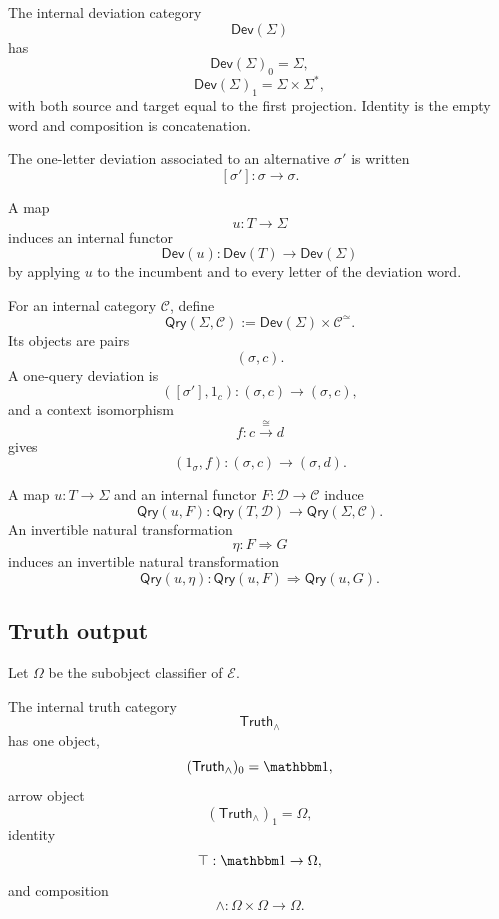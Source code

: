 \begin{definition}
\label{def:internal-deviation-category}
The internal deviation category
\[
  \mathsf{Dev}(\Sigma)
\]
has
\[
  \mathsf{Dev}(\Sigma)_0=\Sigma,
\]
\[
  \mathsf{Dev}(\Sigma)_1=\Sigma\times\Sigma^\ast,
\]
with both source and target equal to the first projection. Identity is the empty word and
composition is concatenation.

The one-letter deviation associated to an alternative \(\sigma'\) is written
\[
  [\sigma']:\sigma\longrightarrow\sigma.
\]
\end{definition}

A map
\[
  u:T\to\Sigma
\]
induces an internal functor
\[
  \mathsf{Dev}(u):
  \mathsf{Dev}(T)
  \longrightarrow
  \mathsf{Dev}(\Sigma)
\]
by applying \(u\) to the incumbent and to every letter of the deviation word.

\begin{definition}
\label{def:internal-query-category}
For an internal category \(\mathcal C\), define
\[
  \mathsf{Qry}(\Sigma,\mathcal C)
  :=
  \mathsf{Dev}(\Sigma)\times\mathcal C^\simeq.
\]
Its objects are pairs
\[
  (\sigma,c).
\]
A one-query deviation is
\[
  ([\sigma'],1_c):
  (\sigma,c)\longrightarrow(\sigma,c),
\]
and a context isomorphism
\[
  f:c\overset{\cong}{\longrightarrow}d
\]
gives
\[
  (1_\sigma,f):
  (\sigma,c)\longrightarrow(\sigma,d).
\]
\end{definition}

A map \(u:T\to\Sigma\) and an internal functor \(F:\mathcal D\to\mathcal C\) induce
\[
  \mathsf{Qry}(u,F):
  \mathsf{Qry}(T,\mathcal D)
  \longrightarrow
  \mathsf{Qry}(\Sigma,\mathcal C).
\]
An invertible natural transformation
\[
  \eta:F\Longrightarrow G
\]
induces an invertible natural transformation
\[
  \mathsf{Qry}(u,\eta):
  \mathsf{Qry}(u,F)
  \Longrightarrow
  \mathsf{Qry}(u,G).
\]

\subsection{Truth output}

Let \(\Omega\) be the subobject classifier of \(\mathcal E\).

\begin{definition}
\label{def:internal-truth-category}
The internal truth category
\[
  \mathsf{Truth}_\wedge
\]
has one object,
\[
  (\mathsf{Truth}_\wedge)_0=\mathbbm1,
\]
arrow object
\[
  (\mathsf{Truth}_\wedge)_1=\Omega,
\]
identity
\[
  \top:\mathbbm1\to\Omega,
\]
and composition
\[
  \wedge:\Omega\times\Omega\to\Omega.
\]
\end{definition}

